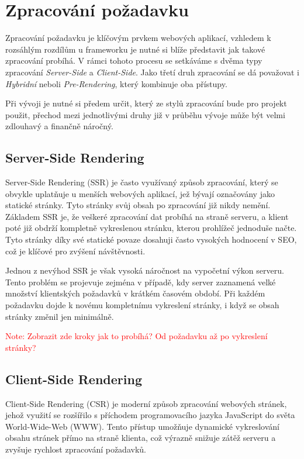 \section{Zpracování požadavku}
\label{sec:dev-request-processing}
Zpracování požadavku je klíčovým prvkem webových aplikací, vzhledem k rozsáhlým rozdílům u frameworku je nutné si blíže představit jak takové zpracování probíhá. V rámci tohoto procesu se setkáváme s dvěma typy zpracování \textit{Server-Side} a \textit{Client-Side}. Jako třetí druh zpracování se dá považovat i \textit{Hybridní} neboli \textit{Pre-Rendering}, který kombinuje oba přístupy.

Při vývoji je nutné si předem určit, který ze stylů zpracování bude pro projekt použit, přechod mezi jednotlivými druhy již v průběhu vývoje může být velmi zdlouhavý a finančně náročný. \cite{request_processing}


\subsection{Server-Side Rendering}
\label{subsec:dev-request-processing-server-side-rendering}
Server-Side Rendering (SSR) je často využívaný způsob zpracování, který se obvykle uplatňuje u menších webových aplikací, jež bývají označovány jako statické stránky. Tyto stránky svůj obsah po zpracování již nikdy nemění. Základem SSR je, že veškeré zpracování dat probíhá na straně serveru, a klient poté již obdrží kompletně vykreslenou stránku, kterou prohlížeč jednoduše načte. Tyto stránky díky své statické povaze dosahuji často vysokých hodnocení v SEO, což je klíčové pro zvýšení návštěvnosti.

Jednou z nevýhod SSR je však vysoká náročnost na vypočetní výkon serveru. Tento problém se projevuje zejména v případě, kdy server zaznamená velké množství klientských požadavků v krátkém časovém období. Při každém požadavku dojde k novému kompletnímu vykreslení stránky, i když se obsah stránky změnil jen minimálně.

\textcolor{red}{Note: Zobrazit zde kroky jak to probíhá? Od požadavku až po vykreslení stránky?}

\subsection{Client-Side Rendering}
\label{subsec:dev-request-processing-client-side-rendering}
Client-Side Rendering (CSR) je moderní způsob zpracování webových stránek, jehož využití se rozšířilo s příchodem programovacího jazyka JavaScript do světa World-Wide-Web (WWW). Tento přístup umožňuje dynamické vykreslování obsahu stránek přímo na straně klienta, což výrazně snižuje zátěž serveru a zvyšuje rychlost zpracování požadavků.

